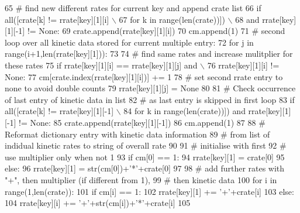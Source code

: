 \begin{DoxyCode}
65 \textcolor{comment}{# find new different rates for current key and append crate list}
66             \textcolor{keywordflow}{if} all([crate[k] != rrate[key][1][i] \(\backslash\)
67                 \textcolor{keywordflow}{for} k \textcolor{keywordflow}{in} range(len(crate))]) \(\backslash\)
68                 \textcolor{keywordflow}{and} rrate[key][1][-1] != \textcolor{keywordtype}{None}:
69                 crate.append(rrate[key][1][i])
70                 cm.append(1)
71 \textcolor{comment}{# second loop over all kinetic data stored for current multiple entry:}
72             \textcolor{keywordflow}{for} j \textcolor{keywordflow}{in} range(i+1,len(rrate[key][1])):
73 
74 \textcolor{comment}{# find same rates and increase mulitplier for these rates}
75                 \textcolor{keywordflow}{if} rrate[key][1][i] == rrate[key][1][j] \textcolor{keywordflow}{and} \(\backslash\)
76                     rrate[key][1][i] != \textcolor{keywordtype}{None}:
77                     cm[crate.index(rrate[key][1][i])] += 1
78 \textcolor{comment}{# set second rrate entry to none to avoid double counts}
79                     rrate[key][1][j] = \textcolor{keywordtype}{None}
80 
81 \textcolor{comment}{# Check occurrence of last entry of kinetic data in list}
82 \textcolor{comment}{# as last entry is skipped in first loop}
83         \textcolor{keywordflow}{if} all([crate[k] != rrate[key][1][-1] \(\backslash\)
84             \textcolor{keywordflow}{for} k \textcolor{keywordflow}{in} range(len(crate))]) \textcolor{keywordflow}{and} rrate[key][1][-1] != \textcolor{keywordtype}{None}:
85             crate.append(rrate[key][1][-1])
86             cm.append(1)
87 
88 \textcolor{comment}{# Reformat dictionary entry with kinetic data information}
89 \textcolor{comment}{# from list of indidual kinetic rates to string of overall rate}
90 
91 \textcolor{comment}{# initialise with first}
92 \textcolor{comment}{# use multiplier only when not 1}
93         \textcolor{keywordflow}{if} cm[0] == 1:
94             rrate[key][1] = crate[0]
95         \textcolor{keywordflow}{else}:
96             rrate[key][1] = str(cm[0])+\textcolor{stringliteral}{'*'}+crate[0]
97 
98 \textcolor{comment}{# add further rates with "+", then multiplier (if different from 1),}
99 \textcolor{comment}{# then kinetic data}
100         \textcolor{keywordflow}{for} i \textcolor{keywordflow}{in} range(1,len(crate)):
101             \textcolor{keywordflow}{if} cm[i] == 1:
102                 rrate[key][1] += \textcolor{stringliteral}{'+'}+crate[i]
103             \textcolor{keywordflow}{else}:
104                 rrate[key][i] += \textcolor{stringliteral}{'+'}+str(cm[i])+\textcolor{stringliteral}{'*'}+crate[i]
105 \end{DoxyCode}
